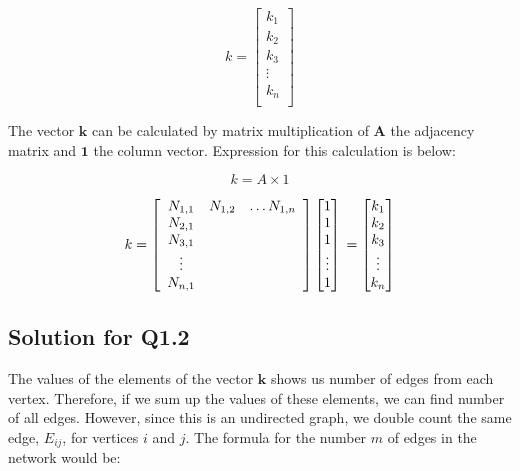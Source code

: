 \documentclass[11pt,a4,twocolumn]{article}
\theoremstyle{plain}
\theoremstyle{definition}
\theoremstyle{remark}
\begin{document}
\[
k = 
\begin{bmatrix}
 k_{1} \\
 k_{2} \\
 k_{3} \\
\vdots \\
 k_{n} \\

\end{bmatrix}
\]

\par
\noindent The vector $\mathbf{k}$ can be calculated by matrix multiplication of $\mathbf{A}$ the adjacency matrix and 
$\mathbf{1}$ the column vector. Expression for this calculation is below:

\[
k = A \times 1
\]

\[
k = 
\left[
  \begin{array}{ccc}
	 N_{1,1} & N_{1,2} & \ldots   N_{1,n}  \\
	 N_{2,1} \\
	 N_{3,1} \\
	\vdots \\
	 N_{n,1} \\
  \end{array}
\right]
\begin{bmatrix}
           $1$ \\
           $1$ \\
           $1$ \\
           \vdots \\
           $1$ \\
\end{bmatrix} \\
= 
\begin{bmatrix}
 k_{1} \\
 k_{2} \\
 k_{3} \\
\vdots \\
 k_{n} 
\end{bmatrix}
\]

\subsection{Solution for Q1.2}

The values of the elements of the vector $\mathbf{k}$ shows us number of edges from each vertex. Therefore, if we sum up the values of these elements, we can find number of all edges. However, since this is an undirected graph, we double count the same edge, $E_{ij}$, for  vertices $i$ and $j$.  The formula for the number $m$ of edges in the network would be:
\end{document}
